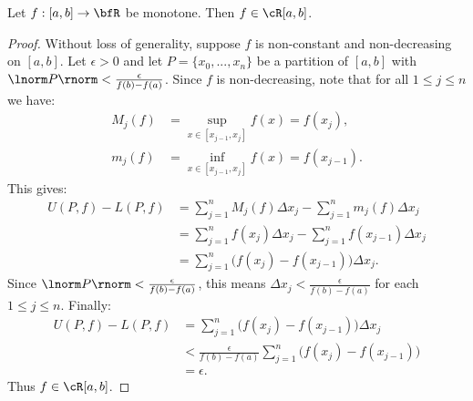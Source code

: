 \documentclass[10pt,twoside,openany]{memoir}
\begin{document}
    \begin{theorem}
        Let $f:[a,b] \rightarrow \bfR$ be monotone. Then $f \in \cR[a,b]$.
    \end{theorem}
        \begin{proof}
            Without loss of generality, suppose $f$ is non-constant and non-decreasing on $[a,b]$. Let $\epsilon > 0$ and let $P = \{x_0,...,x_n\}$ be a partition of $[a,b]$ with $\lnorm P \rnorm < \frac{\epsilon}{f(b) - f(a)}$. Since $f$ is non-decreasing, note that for all $1 \leq j \leq n$ we have:
                \begin{equation*}
                \begin{split}
                    M_j(f) & = \sup_{x \in [x_{j-1},x_j]}f(x) = f(x_j), \\
                    m_j(f) & = \inf_{x \in [x_{j-1},x_j]}f(x) = f(x_{j-1}).
                \end{split}
                \end{equation*}
            This gives:
                \begin{equation*}
                \begin{split}
                    U(P,f) - L(P,f)
                    & = \sum_{j = 1}^n M_j(f)\Delta x_j - \sum_{j = 1}^n m_j(f)\Delta x_j \\
                    & = \sum_{j = 1}^n f(x_j)\Delta x_j - \sum_{j = 1}^n f(x_{j-1})\Delta x_j \\
                    & = \sum_{j = 1}^n \bigl(f(x_j) - f(x_{j-1})\bigr)\Delta x_j.
                \end{split}
                \end{equation*}
            Since $\lnorm P \rnorm < \frac{\epsilon}{f(b) - f(a)}$, this means $\Delta x_j < \frac{\epsilon}{f(b)-f(a)}$ for each $1 \leq j \leq n$. Finally:
                \begin{equation*}
                \begin{split}
                    U(P,f) - L(P,f)
                    & = \sum_{j = 1}^n \bigl(f(x_j) - f(x_{j-1})\bigr)\Delta x_j \\
                    & < \frac{\epsilon}{f(b) - f(a)}\sum_{j = 1}^n \bigl(f(x_j) - f(x_{j-1})\bigr) \\
                    & = \epsilon.
                \end{split}
                \end{equation*}
            Thus $f \in \cR[a,b]$.
        \end{proof}
\end{document}
